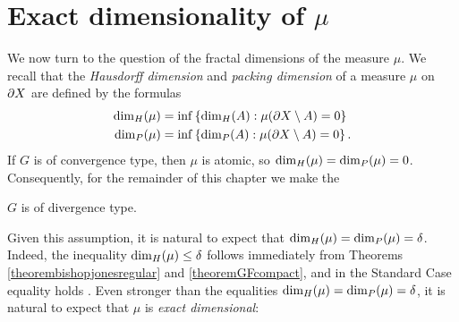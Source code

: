




\section{Exact dimensionality of $\mu$}
\label{subsectionexactdimensional}
We now turn to the question of the fractal dimensions of the measure $\mu$. We recall that the \emph{Hausdorff dimension} and \emph{packing dimension} of a measure $\mu$ on $\partial X$ are defined by the formulas
\begin{align*}
{\dim_H}(\mu) &= \inf\left\{{\dim_H}(A): \mu(\partial X\setminus A) = 0\right\}\\
{\dim_P}(\mu) &= \inf\left\{{\dim_P}(A): \mu(\partial X\setminus A) = 0\right\}.
\end{align*}
If $G$ is of convergence type, then $\mu$ is atomic, so ${\dim_H}(\mu) = {\dim_P}(\mu) = 0$. Consequently, for the remainder of this chapter we make the
\begin{standingassumption}
\label{assumptiondivergencetype}
$G$ is of divergence type.
\end{standingassumption}
Given this assumption, it is natural to expect that ${\dim_H}(\mu) = {\dim_P}(\mu) = \delta$. Indeed, the inequality ${\dim_H}(\mu)\leq\delta$ follows immediately from Theorems \ref{theorembishopjonesregular} and \ref{theoremGFcompact}, and in the Standard Case equality holds \cite[Proposiiton 4.10]{StratmannVelani}. Even stronger than the equalities ${\dim_H}(\mu) = {\dim_P}(\mu) = \delta$, it is natural to expect that $\mu$ is \emph{exact dimensional}:

